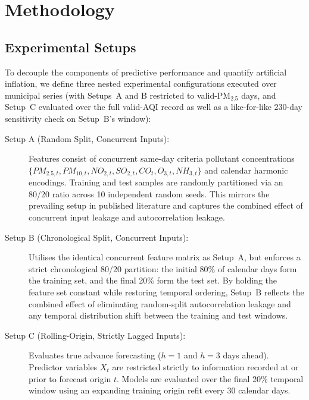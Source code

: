 \section{Methodology}
\label{sec:method}

\subsection{Experimental Setups}
To decouple the components of predictive performance and quantify artificial inflation, we define three nested experimental configurations executed over municipal series (with Setups~A and B restricted to valid-PM$_{2.5}$ days, and Setup~C evaluated over the full valid-AQI record as well as a like-for-like 230-day sensitivity check on Setup~B's window):

\begin{description}
  \item[Setup A (Random Split, Concurrent Inputs):] Features consist of concurrent same-day criteria pollutant concentrations $\{PM_{2.5,t}, PM_{10,t}, NO_{2,t}, SO_{2,t}, CO_t, O_{3,t}, NH_{3,t}\}$ and calendar harmonic encodings. Training and test samples are randomly partitioned via an 80/20 ratio across 10 independent random seeds. This mirrors the prevailing setup in published literature and captures the combined effect of concurrent input leakage and autocorrelation leakage.
  \item[Setup B (Chronological Split, Concurrent Inputs):] Utilises the identical concurrent feature matrix as Setup~A, but enforces a strict chronological 80/20 partition: the initial 80\% of calendar days form the training set, and the final 20\% form the test set. By holding the feature set constant while restoring temporal ordering, Setup~B reflects the combined effect of eliminating random-split autocorrelation leakage and any temporal distribution shift between the training and test windows.
  \item[Setup C (Rolling-Origin, Strictly Lagged Inputs):] Evaluates true advance forecasting ($h=1$ and $h=3$ days ahead). Predictor variables $X_t$ are restricted strictly to information recorded at or prior to forecast origin $t$. Models are evaluated over the final 20\% temporal window using an expanding training origin refit every 30 calendar days.
\end{description}


